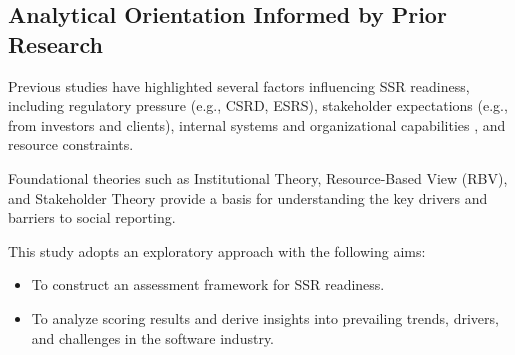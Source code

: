 \subsection{Analytical Orientation Informed by Prior Research}
Previous studies have highlighted several factors influencing SSR readiness, including regulatory pressure (e.g., CSRD, ESRS), stakeholder expectations (e.g., from investors and clients), internal systems and organizational capabilities \parencite{Christensen2021}, and resource constraints.

Foundational theories such as Institutional Theory, Resource-Based View (RBV), and Stakeholder Theory provide a basis for understanding the key drivers and barriers to social reporting.

This study adopts an exploratory approach with the following aims:
\begin{itemize}
    \item To construct an assessment framework for SSR readiness.
    \item To analyze scoring results and derive insights into prevailing trends, drivers, and challenges in the software industry.
\end{itemize}